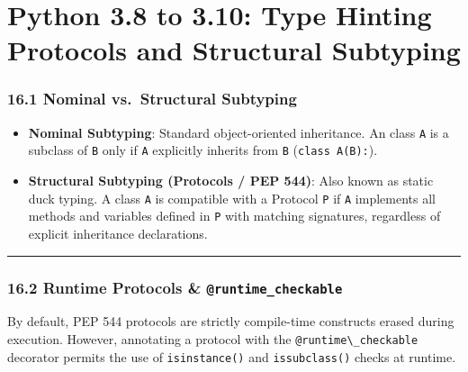 \hypertarget{python-3.8-to-3.10-type-hinting-protocols-and-structural-subtyping}{%
\chapter{Python 3.8 to 3.10: Type Hinting Protocols and Structural
Subtyping}\label{python-3.8-to-3.10-type-hinting-protocols-and-structural-subtyping}}

\hypertarget{nominal-vs.-structural-subtyping}{%
\subsection{16.1 Nominal vs.~Structural
Subtyping}\label{nominal-vs.-structural-subtyping}}

\begin{itemize}
\tightlist
\item
  \textbf{Nominal Subtyping}: Standard object-oriented inheritance. An
  class \passthrough{\lstinline!A!} is a subclass of
  \passthrough{\lstinline!B!} only if \passthrough{\lstinline!A!}
  explicitly inherits from \passthrough{\lstinline!B!}
  (\passthrough{\lstinline!class A(B):!}).
\item
  \textbf{Structural Subtyping (Protocols / PEP 544)}: Also known as
  static duck typing. A class \passthrough{\lstinline!A!} is compatible
  with a Protocol \passthrough{\lstinline!P!} if
  \passthrough{\lstinline!A!} implements all methods and variables
  defined in \passthrough{\lstinline!P!} with matching signatures,
  regardless of explicit inheritance declarations.
\end{itemize}

\begin{center}\rule{0.5\linewidth}{0.5pt}\end{center}

\hypertarget{runtime-protocols-runtime_checkable}{%
\subsection{\texorpdfstring{16.2 Runtime Protocols \&
\texttt{@runtime\_checkable}}{16.2 Runtime Protocols \& @runtime\_checkable}}\label{runtime-protocols-runtime_checkable}}

By default, PEP 544 protocols are strictly compile-time constructs
erased during execution. However, annotating a protocol with the
\passthrough{\lstinline!@runtime\_checkable!} decorator permits the use
of \passthrough{\lstinline!isinstance()!} and
\passthrough{\lstinline!issubclass()!} checks at runtime.


